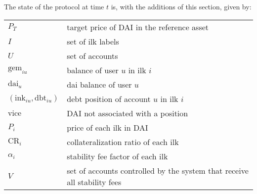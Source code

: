 \documentclass{article}
\begin{document}
The state of the protocol at time \(t\) is, with the additions of this section, given by:

\begin{tabular}{l l}
    \(P_T\) & target price of DAI in the reference asset \\
    \(I\)      & set of ilk labels \\
    \(U\)      & set of accounts \\
    \(\text{gem}_{iu}\) & balance of user \(u\) in ilk \(i\) \\
    \(\text{dai}_{u}\)  & dai balance of user \(u\) \\
    \((\text{ink}_{iu}, \text{dbt}_{iu})\) & debt position of account \(u\) in ilk \(i\) \\
    \(\text{vice}\) & DAI not associated with a position \\
    \(P_i\) & price of each ilk in DAI \\
    \(\text{CR}_i\) & collateralization ratio of each ilk \\ 
    \(\alpha_i\) & stability fee factor of each ilk \\
    \(V\) & set of accounts controlled by the system that receive all stability fees \\
\end{tabular}
\end{document}
